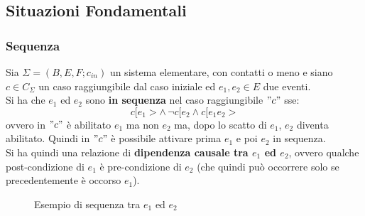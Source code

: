 \subsection{Situazioni Fondamentali}
\subsubsection{Sequenza}
\begin{definizione}
  Sia $\Sigma = (B, E, F;c_{in})$ un sistema elementare, con contatti o meno
  e siano $c\in C_\Sigma$ un caso raggiungibile dal caso iniziale ed $e_1, e_2\in
  E$ due eventi.\\
  Si ha che $e_1$ ed $e_2$ sono \textbf{in sequenza} nel caso
  raggiungibile $"c"$ sse:
  \[c[e_1>\wedge\, \neg c[e_2\wedge c[e_1e_2>\]
  ovvero in $"c"$ è abilitato $e_1$ ma non $e_2$ ma, dopo lo scatto di $e_1$,
  $e_2$ diventa abilitato. Quindi in $"c"$ è possibile attivare prima $e_1$ e poi
  $e_2$ in sequenza.\\
  Si ha quindi una relazione di \textbf{dipendenza causale tra $e_1$ ed $e_2$},
  ovvero qualche post-condizione di $e_1$ è pre-condizione di $e_2$ (che quindi
  può occorrere solo se precedentemente è occorso $e_1$).
  \begin{figure}[H]
    \centering
    \caption{Esempio di sequenza tra $e_1$ ed $e_2$}
  \end{figure}
\end{definizione} \vspace{5mm} %
